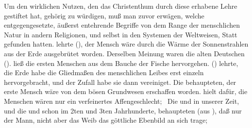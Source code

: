 Um den wirklichen Nutzen, den das Christenthum durch diese erhabene Lehre gestiftet hat, gehörig zu würdigen, muß man zuvor erwägen, welche entgegengesetzte, äußerst entehrende Begriffe von dem Range der menschlichen Natur in andern Religionen, und selbst in den Systemen der Weltweisen, Statt gefunden hatten.  lehrte (), der Mensch wäre durch die Wärme der Sonnenstrahlen aus der Erde ausgebrütet worden. Derselben Meinung waren die alten Deutschen ().  ließ die ersten Menschen aus dem Bauche der Fische hervorgehen.  () lehrte, die Erde habe die Gliedmaßen des menschlichen Leibes erst einzeln hervorgebracht, und der Zufall habe sie dann vereiniget. Die  behaupteten, der erste Mensch wäre von dem bösen Grundwesen erschaffen worden.  hielt dafür, die Menschen wären nur ein verfeinertes Affengeschlecht; \usw\ Die  und  in unserer Zeit, und die  und  schon im 2ten und 3ten Jahrhunderte, behaupteten (aus ), daß nur der Mann, nicht aber das Weib das göttliche Ebenbild an sich trage; \usw\

